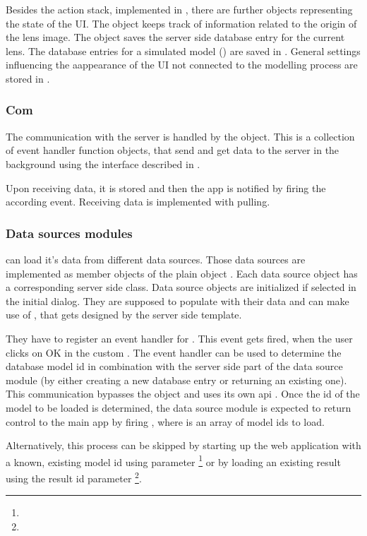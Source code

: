 Besides the action stack, implemented in , there are further objects representing the state of the UI.
The object  keeps track of information related to the origin of the lens image.
The object  saves the server side database entry for the current lens.
The database entries for a simulated model () are saved in .
General settings influencing the aappearance of the UI not connected to the modelling process are stored in .




\subsubsection{Com}
The communication with the server is handled by the  object.
This is a collection of event handler function objects, that send and get data to the server in the background using the interface described in .

Upon receiving data, it is stored and then the app is notified by firing the according event. Receiving data is implemented with pulling.


\subsubsection{Data sources modules}

\spl can load it's data from different data sources.
Those data sources are implemented as member objects of the plain object .
Each data source object has a corresponding server side class.
Data source objects are initialized if selected in the initial dialog.
They are supposed to populate  with their data and can make use of , that gets designed by the server side template.

They have to register an event handler for .
This event gets fired, when the user clicks on OK in the custom .
The event handler can be used to determine the database model id in combination with the server side part of the data source module (by either creating a new database entry or returning an existing one). This communication bypasses the  object and uses its own api .
Once the id of the model to be loaded is determined, the data source module is expected to return control to the main app by firing , where  is an array of model ids to load.

Alternatively, this process can be skipped by starting up the web application with a known, existing model id using  parameter \footnote{\splurl[?mid=42]} or by loading an existing result using the result id  parameter \footnote{\splurl[?rid=1337]}.



